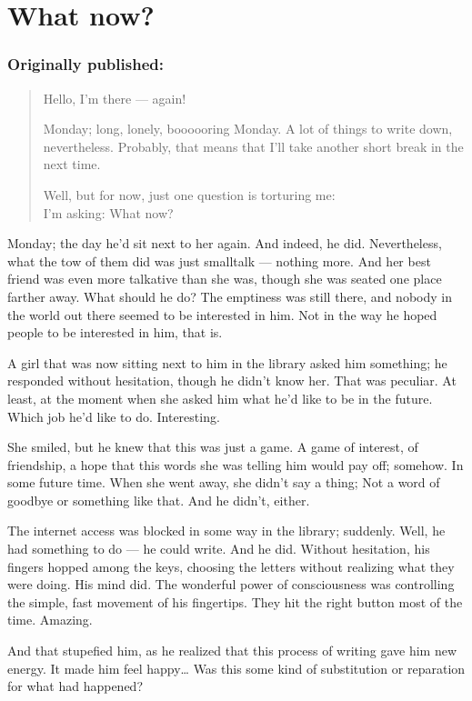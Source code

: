 \chapter{What now?}
\label{cha:what-now}
\subsection*{Originally published: }
\begin{quote}
Hello, I'm there --- again!

Monday; long, lonely, boooooring Monday. 
A lot of things to write down, nevertheless. 
Probably, that means that I'll take another short break in the next time. 

Well, but for now, just one question is torturing me:\\
I'm asking: What now?
\end{quote}

Monday; the day he'd sit next to her again. And indeed, he did. Nevertheless, what the tow of them did was just smalltalk --- nothing more. 
And her best friend was even more talkative than she was, though she was seated one place farther away. 
What should he do? The emptiness was still there, and nobody in the world out there seemed to be interested in him. 
Not in the way he hoped people to be interested in him, that is.

A girl that was now sitting next to him in the library asked him something; he responded without hesitation, though he didn't know her. 
That was peculiar. 
At least, at the moment when she asked him what he'd like to be in the future. 
Which job he'd like to do. 
Interesting.

She smiled, but he knew that this was just a game. A game of interest, of friendship, a hope that this words she was telling him would pay off; somehow. 
In some future time. 
When she went away, she didn't say a thing; Not a word of goodbye or something like that. 
And he didn't, either.

The internet access was blocked in some way in the library; suddenly. Well, he had something to do --- he could write. And he did. 
Without hesitation, his fingers hopped among the keys, choosing the letters without realizing what they were doing. 
His mind did. The wonderful power of consciousness was controlling the simple, fast movement of his fingertips. 
They hit the right button most of the time. 
Amazing.

And that stupefied him, as he realized that this process of writing gave him new energy. It made him feel happy\dots{}
Was this some kind of substitution or reparation for what had happened?

